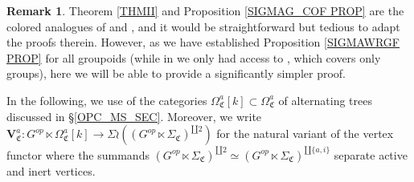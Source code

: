 \documentclass[a4paper,10pt
,draft
]{article}%
\numberwithin{equation}{section}
\numberwithin{figure}{section}
\theoremstyle{definition} %
\newtheorem{remark}[equation]{Remark}%
\newcommand{\1}{\ensuremath{\mathbbm 1}}%
\begin{document}
\begin{remark}\label{STRTED REM}
	Theorem \ref{THMII} and Proposition \ref{SIGMAG_COF PROP}
	are the colored analogues of 
	\cite[Lemma 6.64]{BP_geo} and \cite[Rem. 6.70]{BP_geo},
	and it would be straightforward but tedious to adapt the proofs therein.
	However, as we have established 
	Proposition \ref{SIGMAWRGF PROP} for all groupoids
	(while in \cite{BP_geo}
	we only had access to \cite[Prop. 6.25]{BP_geo},
	which covers only groups),
	here we will be able to provide a significantly simpler proof.
\end{remark}



In the following, we use of the categories
$\Omega^{a}_{\mathfrak{C}}[k] 
\subset 
\Omega^{a}_{\mathfrak{C}}$
of alternating trees discussed in \S \ref{OPC_MS_SEC}.
Moreover, we write
$\boldsymbol{V}^a_{\mathfrak{C}}
\colon G^{op} \ltimes \Omega^{a}_{\mathfrak{C}}[k] 
\to 
\Sigma \wr 
\left((G^{op} \ltimes \Sigma_{\mathfrak{C}})^{\amalg 2}\right)$ 
for the natural variant of the vertex functor 
where the summands 
$(G^{op} \ltimes \Sigma_{\mathfrak{C}})^{\amalg 2} \simeq
(G^{op} \ltimes \Sigma_{\mathfrak{C}})^{\amalg \{a,i\}}$
separate active and inert vertices.
\end{document}
